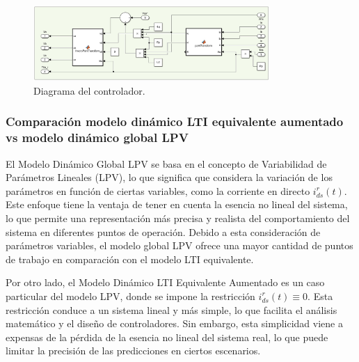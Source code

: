 \documentclass{article}
\begin{document}
\begin{enumerate}[label=\roman*.]
    \begin{figure}[H]
        \centering
        \includegraphics[width=0.8\textwidth]{LTI_AUMENTADO_Q_CONTROLADOR.jpg}
        \caption{Diagrama del controlador.}
    \end{figure}

\end{enumerate}


\subsubsection{Comparación modelo dinámico LTI equivalente aumentado vs modelo dinámico global LPV}

El Modelo Dinámico Global LPV se basa en el concepto de Variabilidad de Parámetros Lineales (LPV), 
lo que significa que considera la variación de los parámetros en función de ciertas variables, como 
la corriente en directo $i^r_{ds}(t)$. Este enfoque tiene la ventaja de tener en cuenta la esencia no 
lineal del sistema, lo que permite una representación más precisa y realista del comportamiento del 
sistema en diferentes puntos de operación. Debido a esta consideración de parámetros variables, el 
modelo global LPV ofrece una mayor cantidad de puntos de trabajo en comparación con el modelo LTI 
equivalente.

Por otro lado, el Modelo Dinámico LTI Equivalente Aumentado es un caso particular del modelo LPV, 
donde se impone la restricción $i^r_{ds}(t) \equiv 0$. Esta restricción conduce a un sistema lineal y más simple, lo que facilita el análisis 
matemático y el diseño de controladores. Sin embargo, esta simplicidad viene a expensas de la pérdida 
de la esencia no lineal del sistema real, lo que puede limitar la precisión de las predicciones en 
ciertos escenarios.
\end{document}
